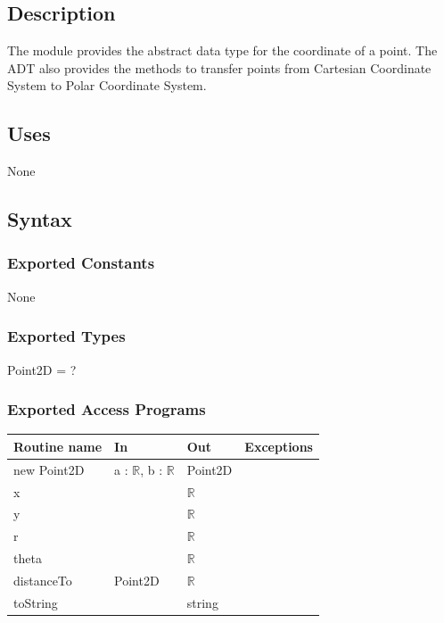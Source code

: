 \documentclass[12pt]{article}
\begin{document}
\subsection*{Description}
The module provides the abstract data type for the coordinate of a point. The ADT also provides the methods to transfer points from Cartesian Coordinate System to Polar Coordinate System.

\subsection* {Uses}

None

\subsection* {Syntax}

\subsubsection* {Exported Constants}

None

\subsubsection* {Exported Types}

Point2D = ?

\subsubsection* {Exported Access Programs}

\begin{tabular}{| l | l | l | p{5cm} |}
\hline
\textbf{Routine name} & \textbf{In} & \textbf{Out} & \textbf{Exceptions}\\
\hline
new Point2D & a : $\mathbb{R}$, b : $\mathbb{R}$ & Point2D & \\
\hline
x & ~ & $\mathbb{R} $ & ~\\
\hline
y & ~ & $\mathbb{R}$ & ~\\
\hline
r & ~ &  $\mathbb{R}$ & ~\\
\hline
theta & ~ & $\mathbb{R}$ & ~\\
\hline
distanceTo & Point2D & $\mathbb{R}$ & ~\\
\hline
toString & ~ & string & ~\\
\hline
\end{tabular}
\end{document}
